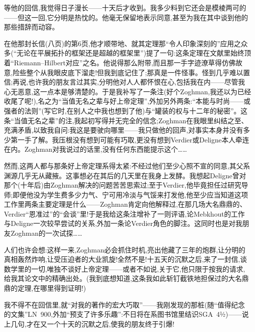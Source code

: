 等他的回信,我觉得日子漫长——十天后才收到。我多少料到它还会是模棱两可的——但\dmark{}这一回,它分明是热忱的。他毫无保留地表示同意,甚至为我在其中谈到他的那些措辞而动容。

在他那封长信(八页)的第6页,他才顺带地、就其定理那“令人印象深刻的”应用之众多(“无论在平展拓扑的框架还是超越的框架里”)提了一句:这条定理在文献里始终顶着“Riemann--Hilbert对应”之名。他说得那么附带,而且那一手字迹潦草得仿佛故意,险些整个从我眼皮底下溜走!但我到底记住了;那真是一件怪事。怪到几乎难以置信;再说,也许我的朋友言过其实,分明他对人人都怀恨在心,包括我在内——尽管我心无恶意,这一点本是够清楚的。于是我补写了一条注(好个Zoghman,我还以为已经收尾了呢!),名之为“当值无名之辈与好上帝定理”,外加另外两条:“本能与时尚——或强者的法则”(写它时,在别人之中我也想到了他)与“罐装的权与十二年的秘密”。这条“当值无名之辈”的注,我起初写得并无完全的信念;Zoghman在我眼里纠结之至、充满矛盾,以致我自问:我这是要驶向哪里——我只做他的回声,对事实本身并没有多少第一手了解。我压根没有想到可能有巧取,更没有想到Verdier或Deligne本人牵连在内。Zoghman对我说过的话里,没有任何东西能提示这个……

然而,这两人都与那条好上帝定理系得太紧:不经过他们至少心照不宣的同意,其父系渊源几乎无从藏掖。这事想必在其后的几天里在我身上发酵。我想起Deligne曾对那个(十年后)由Zoghman解决的问题苦苦思索过;至于Verdier,他毕竟担任过研究导师;即便他没为学生费多少力气、宁可用冷淡与气馁来打发他,他至少应当知道这项工作里两条主要定理是什么——Zoghman肯定向他解释过,在那几场大名鼎鼎的、Verdier\dmark{}“恩准过”的“会谈”里!于是我给这条注增补了一则评语,论Mebkhout的工作与Deligne一次较早尝试的关系,外加一条论Verdier角色的脚注。这同时也是对我朋友Zoghman的一次试探……

人们也许会想:这样一来,Zoghman必会抓住时机,亮出他藏了三年的炮群,让分明的真相轰然炸响,让受压迫者的大业凯旋!全然不是!十五天的沉默之后,来了一封信,谈数学里的一切,唯独不谈好上帝定理——或者不如说,关于它,他只限于按我的请求,给我其论文中的精确出处。(我到底想知道,这条我如此斩钉截铁地担保过的大名鼎鼎的定理,在哪里得到证明!)

我不得不在回信里,就“对我的著作的宏大巧取”——我刚发现的那桩(随“值得纪念的文集”LN~900,外加“预支了许多乐趣”:不日将在系图书馆里结识SGA~4½)——说上几句,才在又一个十天的沉默之后,使我的朋友终于引爆!

